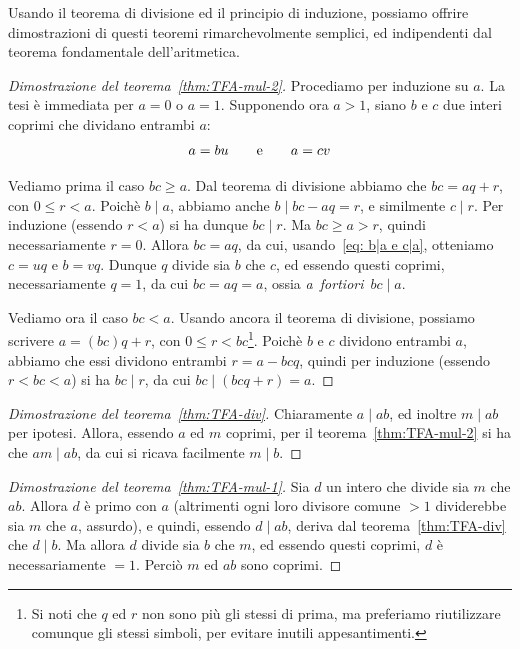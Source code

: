 \documentclass[pdflatex,11pt,a4paper,oneside]{article}
\newcommand{\TFA}{teorema fondamentale dell'aritmetica}
\newcommand{\p}[1]{\left({#1}\right)}
\newcommand{\divides}[0]{\mid}
\begin{document}
Usando il teorema di divisione ed il principio di induzione, possiamo
offrire dimostrazioni di questi teoremi rimarchevolmente semplici, ed
indipendenti dal \TFA.
%
\begin{proof}[Dimostrazione del teorema~\eqref{thm:TFA-mul-2}]
%
Procediamo per induzione su $a$.  La tesi \`e immediata per $a = 0$ o
$a = 1$.  Supponendo ora $a > 1$, siano $b$ e $c$ due interi coprimi
che dividano entrambi $a$:%
  \vspace*{-5pt}%
\begin{equation}\label{eq: b|a e c|a}
a = bu \qquad\textrm{e}\qquad a = cv
  \vspace*{-5pt}%
\end{equation}

Vediamo prima il caso $bc \geq a$. Dal teorema di divisione abbiamo che
$bc = aq + r$, con $0 \leq r < a$.  Poich\`e $b \divides a$, abbiamo
anche $b \divides bc - aq = r$, e similmente $c \divides r$.  Per
induzione (essendo $r < a$) si ha dunque $bc \divides r$. Ma $bc \geq
a > r$, quindi necessariamente $r = 0$. Allora $bc = aq$, da cui,
usando~\eqref{eq: b|a e c|a}, otteniamo $c = uq$ e $b = vq$.  Dunque $q$
divide sia $b$ che $c$, ed essendo questi coprimi, necessariamente
$q = 1$, da cui $bc = aq = a$, ossia \emph{a~fortiori}
\,$bc \divides a$.

\smallskip
Vediamo ora il caso $bc < a$. Usando ancora il teorema di divisione,
possiamo scrivere $a = (bc)q + r$, con $0 \leq r < bc$\footnote{Si
noti che $q$ ed $r$ non sono pi\`u gli stessi di prima, ma preferiamo
riutilizzare comunque gli stessi simboli, per evitare inutili
appesantimenti.}. Poich\`e $b$ e $c$ dividono entrambi $a$, abbiamo
che essi dividono entrambi $r = a - bcq$, quindi per induzione
(essendo $r < bc < a$) si ha $bc \divides r$, da cui
$bc \divides \p{bcq + r} = a$.
%
\end{proof}

\begin{proof}[Dimostrazione del teorema~\eqref{thm:TFA-div}]
Chiaramente $a \divides ab$, ed inoltre $m \divides ab$ per ipotesi.
Allora, essendo $a$ ed $m$ coprimi, per il teorema~\eqref{thm:TFA-mul-2}
si ha che $am \divides ab$, da cui si ricava facilmente $m \divides b$.
\end{proof}

\begin{proof}[Dimostrazione del teorema~\eqref{thm:TFA-mul-1}]
Sia $d$ un intero che divide sia $m$ che $ab$.  Allora $d$ \`e primo
con $a$ (altrimenti ogni loro divisore comune $> 1$ dividerebbe sia
$m$ che $a$, assurdo), e quindi, essendo $d \divides ab$, deriva dal
teorema~\eqref{thm:TFA-div} che $d \divides b$.  Ma allora $d$ divide
sia $b$ che $m$, ed essendo questi coprimi, $d$ \`e necessariamente
$= 1$. Perci\`o $m$ ed $ab$ sono coprimi.
\end{proof}
\end{document}
